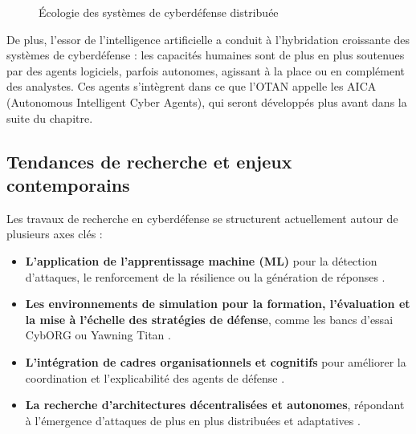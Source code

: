 \documentclass[ twoside,openright,titlepage,numbers=noenddot,headinclude,%
                footinclude=true,cleardoublepage=empty,abstractoff, %
                BCOR=5mm,paper=a4,fontsize=11pt,%
                french,american,%
                ]{scrreprt}
\begin{document}
\begin{figure}[H]
    \centering
    \caption{Écologie des systèmes de cyberdéfense distribuée}
    \label{fig:ecologie-defense}
\end{figure}

De plus, l'essor de l'intelligence artificielle a conduit à l'hybridation croissante des systèmes de cyberdéfense : les capacités humaines sont de plus en plus soutenues par des agents logiciels, parfois autonomes, agissant à la place ou en complément des analystes. Ces agents s'intègrent dans ce que l'OTAN appelle les AICA (Autonomous Intelligent Cyber Agents), qui seront développés plus avant dans la suite du chapitre.

\subsection*{Tendances de recherche et enjeux contemporains}

Les travaux de recherche en cyberdéfense se structurent actuellement autour de plusieurs axes clés :

\begin{itemize}
    \item \textbf{L'application de l'apprentissage machine (ML)} pour la détection d'attaques, le renforcement de la résilience ou la génération de réponses \cite{hammar2021autonomous, mitrokotsa2018machine}.

    \item \textbf{Les environnements de simulation pour la formation, l'évaluation et la mise à l'échelle des stratégies de défense}, comme les bancs d'essai CybORG \cite{cyborg2021} ou Yawning Titan \cite{yawning2022}.

    \item \textbf{L'intégration de cadres organisationnels et cognitifs} pour améliorer la coordination et l'explicabilité des agents de défense \cite{ferber1997multi, moise2002}.

    \item \textbf{La recherche d'architectures décentralisées et autonomes}, répondant à l'émergence d'attaques de plus en plus distribuées et adaptatives \cite{asap2022}.
\end{itemize}
\end{document}
